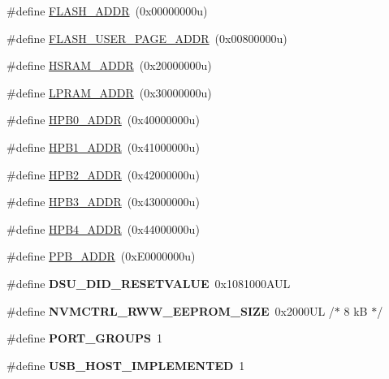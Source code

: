 \begin{DoxyCompactItemize}
\item 
\#define \hyperlink{group___s_a_m_l21_e18_a__definitions_ga485a21e55bcc66416a04d2fec83513fa}{F\+L\+A\+S\+H\+\_\+\+A\+D\+D\+R}~(0x00000000u)
\item 
\#define \hyperlink{group___s_a_m_l21_e18_a__definitions_ga263dc504b29b21d616514ac65000957e}{F\+L\+A\+S\+H\+\_\+\+U\+S\+E\+R\+\_\+\+P\+A\+G\+E\+\_\+\+A\+D\+D\+R}~(0x00800000u)
\item 
\#define \hyperlink{group___s_a_m_l21_e18_a__definitions_ga4af52d124825da5da360f11f45660723}{H\+S\+R\+A\+M\+\_\+\+A\+D\+D\+R}~(0x20000000u)
\item 
\#define \hyperlink{group___s_a_m_l21_e18_a__definitions_gafcca70ccd0ff44656cf27b68218ef780}{L\+P\+R\+A\+M\+\_\+\+A\+D\+D\+R}~(0x30000000u)
\item 
\#define \hyperlink{group___s_a_m_l21_e18_a__definitions_gaa3dc0741f009f571f4a45086601718f6}{H\+P\+B0\+\_\+\+A\+D\+D\+R}~(0x40000000u)
\item 
\#define \hyperlink{group___s_a_m_l21_e18_a__definitions_gabdae009c8fef488e4248183ffa937535}{H\+P\+B1\+\_\+\+A\+D\+D\+R}~(0x41000000u)
\item 
\#define \hyperlink{group___s_a_m_l21_e18_a__definitions_gaef42fa53ddf169a2a50be70d29f73571}{H\+P\+B2\+\_\+\+A\+D\+D\+R}~(0x42000000u)
\item 
\#define \hyperlink{group___s_a_m_l21_e18_a__definitions_gaf04cc27901ff4e0551572de8a92be273}{H\+P\+B3\+\_\+\+A\+D\+D\+R}~(0x43000000u)
\item 
\#define \hyperlink{group___s_a_m_l21_e18_a__definitions_ga715f8d0987dbf1b42ee8453b72b03b9f}{H\+P\+B4\+\_\+\+A\+D\+D\+R}~(0x44000000u)
\item 
\#define \hyperlink{group___s_a_m_l21_e18_a__definitions_ga8895d0a3a9a3126cc44330f86c8ce564}{P\+P\+B\+\_\+\+A\+D\+D\+R}~(0x\+E0000000u)
\item 
\hypertarget{group___s_a_m_l21_e18_a__definitions_gada75131d542c9e1966238f5488f89bd6}{}\#define {\bfseries D\+S\+U\+\_\+\+D\+I\+D\+\_\+\+R\+E\+S\+E\+T\+V\+A\+L\+U\+E}~0x1081000\+A\+U\+L\label{group___s_a_m_l21_e18_a__definitions_gada75131d542c9e1966238f5488f89bd6}

\item 
\hypertarget{group___s_a_m_l21_e18_a__definitions_gacb7a115808eeb0b50bd55888f9ba65ae}{}\#define {\bfseries N\+V\+M\+C\+T\+R\+L\+\_\+\+R\+W\+W\+\_\+\+E\+E\+P\+R\+O\+M\+\_\+\+S\+I\+Z\+E}~0x2000\+U\+L /$\ast$ 8 k\+B $\ast$/\label{group___s_a_m_l21_e18_a__definitions_gacb7a115808eeb0b50bd55888f9ba65ae}

\item 
\hypertarget{group___s_a_m_l21_e18_a__definitions_gab9243ffe03a1dc631b57a495b4b3d467}{}\#define {\bfseries P\+O\+R\+T\+\_\+\+G\+R\+O\+U\+P\+S}~1\label{group___s_a_m_l21_e18_a__definitions_gab9243ffe03a1dc631b57a495b4b3d467}

\item 
\hypertarget{group___s_a_m_l21_e18_a__definitions_ga880f394946155d1e85a5fde38b7f825a}{}\#define {\bfseries U\+S\+B\+\_\+\+H\+O\+S\+T\+\_\+\+I\+M\+P\+L\+E\+M\+E\+N\+T\+E\+D}~1\label{group___s_a_m_l21_e18_a__definitions_ga880f394946155d1e85a5fde38b7f825a}

\end{DoxyCompactItemize}
